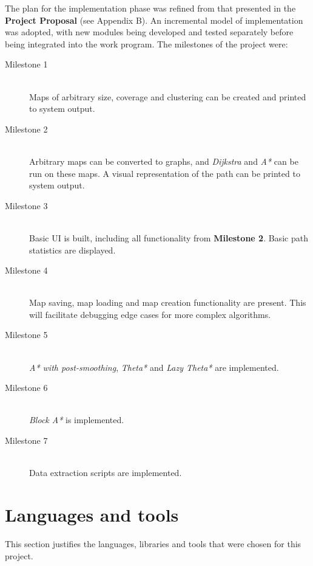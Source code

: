 \documentclass[12pt,notitlepage]{report}
\begin{document}
\noindent
The plan for the implementation phase was refined from that presented in the {\bfseries Project Proposal} (see Appendix B). An incremental model of implementation was adopted, with new modules being developed and tested separately before being integrated into the work program. The milestones of the project were:
\begin{description}
\item[Milestone 1]\hfil \\
Maps of arbitrary size, coverage and clustering can be created and printed to system output.
\item[Milestone 2]\hfil \\
Arbitrary maps can be converted to graphs, and {\em Dijkstra} and {\em A*} can be run on these maps. A visual representation of the path can be printed to system output.
\item[Milestone 3]\hfil \\
Basic UI is built, including all functionality from {\bfseries Milestone 2}. Basic path statistics are displayed.
\item[Milestone 4]\hfil \\
Map saving, map loading and map creation functionality are present. This will facilitate debugging edge cases for more complex algorithms.
\item[Milestone 5]\hfil \\
{\em A* with post-smoothing}, {\em Theta*} and {\em Lazy Theta*} are implemented.
\item[Milestone 6]\hfil \\
{\em Block A*} is implemented.
\item[Milestone 7]\hfil \\
Data extraction scripts are implemented.
\end{description}

\section {Languages and tools}

This section justifies the languages, libraries and tools that were chosen for this project.
\end{document}
